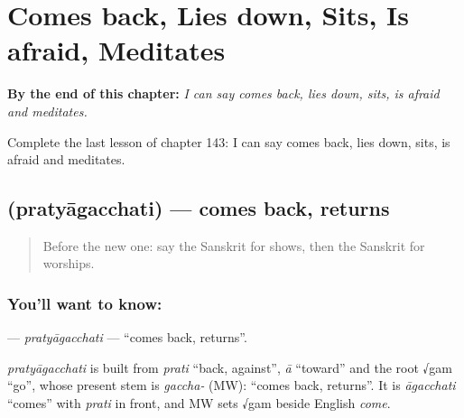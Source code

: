 
\chapter{Comes back, Lies down, Sits, Is afraid, Meditates}
\label{ch:sa-comes-back-lies-down-sits-is-afraid-meditates}

\begin{chapteropening}
\textbf{By the end of this chapter:} \emph{I can say comes back, lies down, sits, is afraid and meditates.}

Complete the last lesson of chapter 143: I can say comes back, lies down, sits, is afraid and meditates.
\end{chapteropening}

\section[\texorpdfstring{\sk{प्रत्यागच्छति} (pratyāgacchati)}{प्रत्यागच्छति (pratyāgacchati)}]{ (pratyāgacchati) — comes back, returns}

\label{lesson:SA-C143-pratyagacchati}



\begin{quote}
Before the new one: say the Sanskrit for shows, then the Sanskrit for worships.
\end{quote}

\subsection*{You'll want to know: }
\textbf{} — \emph{pratyāgacchati} — \textquotedblleft{}comes back, returns\textquotedblright{}.

\begin{cousinweb}
\emph{pratyāgacchati} is built from \emph{prati} \textquotedblleft{}back, against\textquotedblright{}, \emph{ā} \textquotedblleft{}toward\textquotedblright{} and the root √gam \textquotedblleft{}go\textquotedblright{}, whose present stem is \emph{gaccha-} (MW): \textquotedblleft{}comes back, returns\textquotedblright{}. It is \emph{āgacchati} \textquotedblleft{}comes\textquotedblright{} with \emph{prati} in front, and MW sets √gam beside English \emph{come}.
\end{cousinweb}

